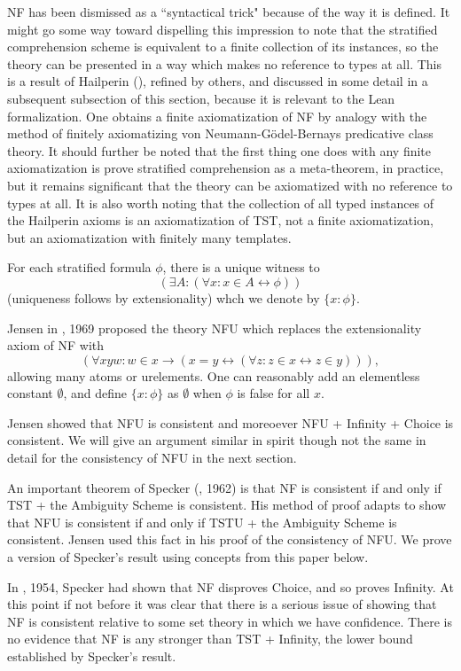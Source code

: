 \documentclass[112pt]{article}
\begin{document}
NF has been dismissed as a ``syntactical trick" because of the way it is defined.  It might go some way toward dispelling this impression to note that the stratified comprehension scheme is equivalent to a finite collection of its instances, so the theory can be presented in a way which makes no reference to types at all.  This is a result of Hailperin (\cite{hailperin}), refined by others, and discussed in some detail in a subsequent subsection of this section, because it is relevant to the Lean formalization.  One obtains a finite axiomatization of NF by analogy with the method of finitely axiomatizing von Neumann-G\"odel-Bernays predicative class theory.  It should further be noted that the first thing one does with any finite axiomatization is prove stratified comprehension as a meta-theorem, in practice, but it remains significant that the theory can be axiomatized with no reference to types at all.  It is also worth noting that the collection of all typed instances of the Hailperin axioms is an axiomatization of TST, not a finite axiomatization, but an axiomatization with finitely many templates.

For each stratified formula $\phi$, there is a unique witness to $$(\exists A:(\forall x:x \in A \leftrightarrow \phi))$$ (uniqueness follows by extensionality) whch we denote by $\{x:\phi\}$.

Jensen in \cite{nfu}, 1969 proposed the theory NFU which replaces the extensionality axiom of NF with $$(\forall xyw:w \in x \rightarrow (x=y \leftrightarrow (\forall z:z \in x \leftrightarrow z\in y))),$$  allowing many atoms or urelements.  One can reasonably add an elementless constant $\emptyset$, and define $\{x:\phi\}$ as $\emptyset$ when $\phi$ is false for all $x$.

Jensen showed that NFU is consistent and moreoever NFU + Infinity + Choice is consistent.  We will give an argument similar in spirit though not the same in detail for the consistency of NFU in the next section.

An important theorem of Specker (\cite{ambiguity}, 1962) is that NF is consistent if and only if TST + the Ambiguity Scheme is consistent.  His method of proof adapts to show that  NFU is consistent if and only if TSTU + the Ambiguity Scheme is consistent.  Jensen used this fact in his proof of the consistency of NFU.  We prove a version of Specker's result using concepts from this paper below.

In \cite{notac}, 1954, Specker had shown that NF disproves Choice, and so proves Infinity.  At this point if not before it was clear that there is a serious issue of showing that NF is consistent relative to some set theory in which we have confidence.  There is no evidence that NF is any stronger than TST + Infinity, the lower bound established by Specker's result.
\end{document}
